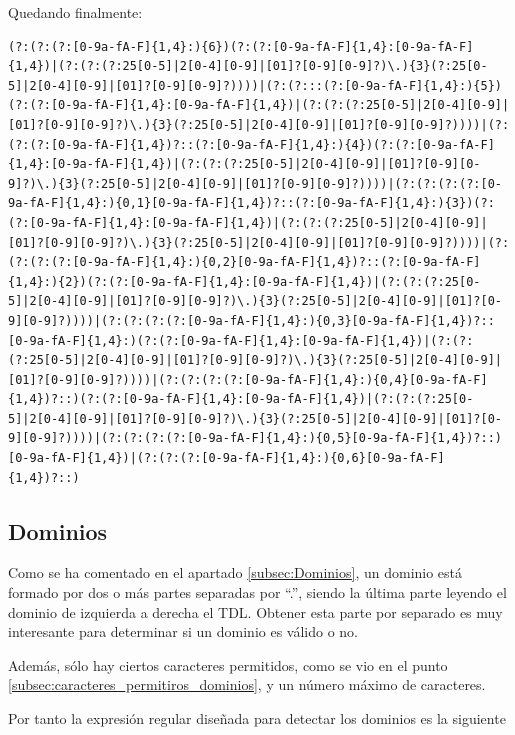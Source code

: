 Quedando finalmente: 
\begin{lstlisting}[breaklines, caption={Expresión regular para capturar direcciones IPv6}, label={Regex:ipv6}, captionpos=b]
(?:(?:(?:[0-9a-fA-F]{1,4}:){6})(?:(?:[0-9a-fA-F]{1,4}:[0-9a-fA-F]{1,4})|(?:(?:(?:25[0-5]|2[0-4][0-9]|[01]?[0-9][0-9]?)\.){3}(?:25[0-5]|2[0-4][0-9]|[01]?[0-9][0-9]?))))|(?:(?:::(?:[0-9a-fA-F]{1,4}:){5})(?:(?:[0-9a-fA-F]{1,4}:[0-9a-fA-F]{1,4})|(?:(?:(?:25[0-5]|2[0-4][0-9]|[01]?[0-9][0-9]?)\.){3}(?:25[0-5]|2[0-4][0-9]|[01]?[0-9][0-9]?))))|(?:(?:(?:[0-9a-fA-F]{1,4})?::(?:[0-9a-fA-F]{1,4}:){4})(?:(?:[0-9a-fA-F]{1,4}:[0-9a-fA-F]{1,4})|(?:(?:(?:25[0-5]|2[0-4][0-9]|[01]?[0-9][0-9]?)\.){3}(?:25[0-5]|2[0-4][0-9]|[01]?[0-9][0-9]?))))|(?:(?:(?:(?:[0-9a-fA-F]{1,4}:){0,1}[0-9a-fA-F]{1,4})?::(?:[0-9a-fA-F]{1,4}:){3})(?:(?:[0-9a-fA-F]{1,4}:[0-9a-fA-F]{1,4})|(?:(?:(?:25[0-5]|2[0-4][0-9]|[01]?[0-9][0-9]?)\.){3}(?:25[0-5]|2[0-4][0-9]|[01]?[0-9][0-9]?))))|(?:(?:(?:(?:[0-9a-fA-F]{1,4}:){0,2}[0-9a-fA-F]{1,4})?::(?:[0-9a-fA-F]{1,4}:){2})(?:(?:[0-9a-fA-F]{1,4}:[0-9a-fA-F]{1,4})|(?:(?:(?:25[0-5]|2[0-4][0-9]|[01]?[0-9][0-9]?)\.){3}(?:25[0-5]|2[0-4][0-9]|[01]?[0-9][0-9]?))))|(?:(?:(?:(?:[0-9a-fA-F]{1,4}:){0,3}[0-9a-fA-F]{1,4})?::[0-9a-fA-F]{1,4}:)(?:(?:[0-9a-fA-F]{1,4}:[0-9a-fA-F]{1,4})|(?:(?:(?:25[0-5]|2[0-4][0-9]|[01]?[0-9][0-9]?)\.){3}(?:25[0-5]|2[0-4][0-9]|[01]?[0-9][0-9]?))))|(?:(?:(?:(?:[0-9a-fA-F]{1,4}:){0,4}[0-9a-fA-F]{1,4})?::)(?:(?:[0-9a-fA-F]{1,4}:[0-9a-fA-F]{1,4})|(?:(?:(?:25[0-5]|2[0-4][0-9]|[01]?[0-9][0-9]?)\.){3}(?:25[0-5]|2[0-4][0-9]|[01]?[0-9][0-9]?))))|(?:(?:(?:(?:[0-9a-fA-F]{1,4}:){0,5}[0-9a-fA-F]{1,4})?::)[0-9a-fA-F]{1,4})|(?:(?:(?:[0-9a-fA-F]{1,4}:){0,6}[0-9a-fA-F]{1,4})?::)
\end{lstlisting}

\subsection{Dominios}\label{subsec:regexDominios}
Como se ha comentado en el apartado \ref{subsec:Dominios}, un dominio está formado por dos o más partes separadas por “.”, siendo la última parte leyendo el dominio de izquierda a derecha el TDL. Obtener esta parte por separado es muy interesante para determinar si un dominio es válido o no. 

Además, sólo hay ciertos caracteres permitidos, como se vio en el punto \ref{subsec:caracteres_permitiros_dominios}, y un número máximo de caracteres.

Por tanto la expresión regular diseñada para detectar los dominios es la siguiente

